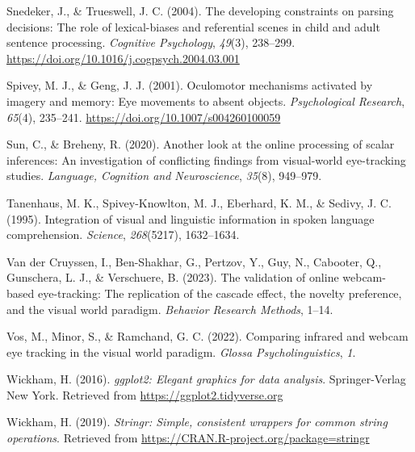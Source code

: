 \documentclass[
  man,floatsintext]{apa6}
\newlength{\cslhangindent}
\newlength{\cslentryspacingunit} %
\newenvironment{CSLReferences}[2] %
 {%
  \setlength{\parindent}{0pt}
  \ifodd #1
  \let\oldpar\par
  \def\par{\hangindent=\cslhangindent\oldpar}
  \fi
  \setlength{\parskip}{#2\cslentryspacingunit}
 }%
 {}
\begin{document}
\begin{CSLReferences}{1}{0}
\leavevmode{}%
Snedeker, J., \& Trueswell, J. C. (2004). The developing constraints on parsing decisions: {The} role of lexical-biases and referential scenes in child and adult sentence processing. \emph{Cognitive Psychology}, \emph{49}(3), 238--299. \url{https://doi.org/10.1016/j.cogpsych.2004.03.001}

\leavevmode{}%
Spivey, M. J., \& Geng, J. J. (2001). Oculomotor mechanisms activated by imagery and memory: Eye movements to absent objects. \emph{Psychological Research}, \emph{65}(4), 235--241. \url{https://doi.org/10.1007/s004260100059}

\leavevmode{}%
Sun, C., \& Breheny, R. (2020). Another look at the online processing of scalar inferences: An investigation of conflicting findings from visual-world eye-tracking studies. \emph{Language, Cognition and Neuroscience}, \emph{35}(8), 949--979.

\leavevmode{}%
Tanenhaus, M. K., Spivey-Knowlton, M. J., Eberhard, K. M., \& Sedivy, J. C. (1995). Integration of visual and linguistic information in spoken language comprehension. \emph{Science}, \emph{268}(5217), 1632--1634.

\leavevmode{}%
Van der Cruyssen, I., Ben-Shakhar, G., Pertzov, Y., Guy, N., Cabooter, Q., Gunschera, L. J., \& Verschuere, B. (2023). The validation of online webcam-based eye-tracking: The replication of the cascade effect, the novelty preference, and the visual world paradigm. \emph{Behavior Research Methods}, 1--14.

\leavevmode{}%
Vos, M., Minor, S., \& Ramchand, G. C. (2022). Comparing infrared and webcam eye tracking in the visual world paradigm. \emph{Glossa Psycholinguistics}, \emph{1}.

\leavevmode{}%
Wickham, H. (2016). \emph{ggplot2: Elegant graphics for data analysis}. Springer-Verlag New York. Retrieved from \url{https://ggplot2.tidyverse.org}

\leavevmode{}%
Wickham, H. (2019). \emph{Stringr: Simple, consistent wrappers for common string operations}. Retrieved from \url{https://CRAN.R-project.org/package=stringr}


\end{CSLReferences}
\end{document}
